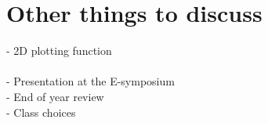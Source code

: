 \documentclass[11pt, a4paper]{article}
\theoremstyle{definition}
\begin{document}
\section{Other things to discuss}

- 2D plotting function \\
\\
- Presentation at the E-symposium\\
- End of year review\\
- Class choices
\end{document}
